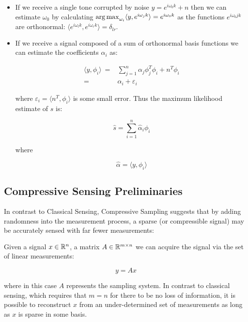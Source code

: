 \documentclass{article}
\begin{document}
\begin{itemize}
\item If we receive a single tone corrupted by noise \(y = e^{i \omega_0 k} + n\) then we can estimate \(\omega_0\) by calculating \(\operatorname*{arg\,max}_{\omega_i} \langle y, e^{i \omega_j k}\rangle = e^{i \omega_0 k}\) as the functions \(e^{i \omega_0 j k }\) are orthonormal: \(\langle e^{i \omega_l k}, e^{i \omega_r k} \rangle = \delta_{lr}\).

\item If we receive a signal composed of a sum of orthonormal basis functions we can estimate the coefficients \(\alpha_i\) as:

\begin{align}
\langle y, \phi_i\rangle\ =& \sum_{j=1}^n \alpha_j \phi_j^T\phi_i + n^T\phi_i \\
=& \alpha_i + \varepsilon_i
\end{align}

where \(\varepsilon_i = \langle n^T, \phi_i \rangle \) is some small error. Thus the maximum likelihood estimate of \(s\) is:

\begin{equation}
\hat{s} = \sum_{i=1}^n \hat{\alpha}_i \phi_i
\end{equation}

where

\begin{equation}
\hat{\alpha} = \langle y, \phi_i \rangle
\end{equation}

\end{itemize}

\subsection{Compressive Sensing Preliminaries} \label{sec:prelims}

In contrast to Classical Sensing, Compressive Sampling suggests that by adding randomness into the measurement process, a sparse (or compressible signal) may be accurately sensed with far fewer measurements:

Given a signal \(x \in {\mathbb{R}}^n\), a matrix \(A \in {\mathbb{R}}^{m \times n}\) we can acquire the signal via the set of linear measurements:

\begin{equation}
y = Ax
\end{equation}

where in this case \(A\) represents the sampling system. In contrast to classical sensing, which requires that \(m = n\) for there to be no loss of information, it is possible to reconstruct \(x\) from an under-determined set of measurements as long as \(x\) is sparse in some basis. 
\end{document}
